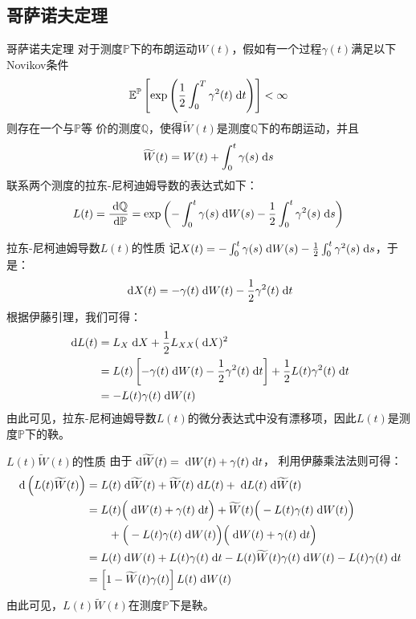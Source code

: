 \documentclass[t]{beamer}
\newcommand{\dif}{{\;\rm d}}
\newcommand{\E}{\mathbb{E}}
\begin{document}
\subsection{哥萨诺夫定理}

\begin{frame}{哥萨诺夫定理}\normalsize
对于测度$\mathbb{P}$下的布朗运动$W(t)$，假如有一个过程$\gamma(t)$满足以下Novikov条件
\[\E^{\mathbb{P}}\left[\exp\left(\frac{1}{2}\int^T_0 \gamma^2(t)\dif t\right)\right]<\infty \]
则存在一个与$\mathbb{P}$等 价的测度$\mathbb{Q}$，使得$\widetilde{W}(t)$是测度$\mathbb{Q}$下的布朗运动，并且
\begin{equation*}
\widetilde{W}(t)=W(t)+\int^t_0 \gamma(s)\dif s
\end{equation*}
联系两个测度的拉东-尼柯迪姆导数的表达式如下：
\begin{equation*}
L(t)=\frac{\dif \mathbb{Q}}{\dif \mathbb{P}}=\exp\left(-\int^t_0 \gamma(s)\dif W(s) -\frac{1}{2} \int^t_0\gamma^2(s)\dif s\right)
\end{equation*}
\end{frame}

\begin{frame}{拉东-尼柯迪姆导数$L(t)$的性质}
记$X(t)=-\int^t_0 \gamma(s)\dif W(s) -\frac{1}{2} \int^t_0\gamma^2(s)\dif s$，于是：
\[\dif X(t)=-\gamma(t)\dif W(t)-\frac{1}{2}\gamma^2(t)\dif t \]
根据伊藤引理，我们可得：
\begin{equation*}
\begin{split}
\dif L(t)&=L_X\dif X+\frac{1}{2}L_{XX}(\dif X)^2\\
&=L(t)\left[-\gamma(t)\dif W(t)-\frac{1}{2}\gamma^2(t)\dif t\right]+\frac{1}{2}L(t) \gamma^2(t)\dif t\\
&=-L(t)\gamma(t)\dif W(t)
\end{split}
\end{equation*}
由此可见，拉东-尼柯迪姆导数$L(t)$的微分表达式中{\color{red}没有漂移项}，因此$L(t)$是{\color{red}测度$\mathbb{P}$下的鞅}。
\end{frame}

\begin{frame}{$L(t)\widetilde{W}(t)$的性质}
由于$\dif\widetilde{W}(t)=\dif W(t)+\gamma(t)\dif t$，
利用伊藤乘法法则可得：
\begin{equation*}
\begin{split}
\dif\left( L(t)\widetilde{W}(t)\right)&=L(t)\dif \widetilde{W}(t) +\widetilde{W}(t) \dif L(t) +\dif L(t)\dif \widetilde{W}(t)\\
&=L(t)\Big(\dif W(t)+\gamma(t)\dif t \Big) +\widetilde{W}(t)\Big(-L(t)\gamma(t)\dif W(t) \Big) \\
&\qquad +\Big(-L(t)\gamma(t)\dif W(t) \Big) \Big(\dif W(t)+\gamma(t)\dif t \Big)\\
&=L(t)\dif W(t)+L(t)\gamma(t)\dif t-L(t)\widetilde{W}(t)\gamma(t)\dif W(t)-L(t)\gamma(t)\dif t\\
&=\left[1-\widetilde{W}(t)\gamma(t)\right]L(t)\dif W(t)
\end{split}
\end{equation*}
由此可见，$L(t)\widetilde{W}(t)${\color{red}在测度$\mathbb{P}$下是鞅}。
\end{frame}
\end{document}
